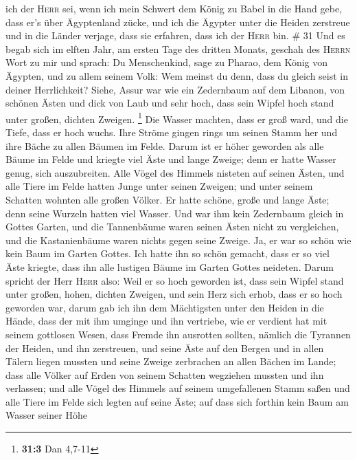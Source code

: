 ich der \textsc{Herr} sei, wenn ich mein Schwert dem König zu Babel in
die Hand gebe, dass er's über Ägyptenland zücke,  und ich
die Ägypter unter die Heiden zerstreue und in die Länder verjage, dass
sie erfahren, dass ich der \textsc{Herr} bin. \# 31  Und
es begab sich im elften Jahr, am ersten Tage des dritten Monats, geschah
des \textsc{Herrn} Wort zu mir und sprach:  Du
Menschenkind, sage zu Pharao, dem König von Ägypten, und zu allem seinem
Volk: Wem meinst du denn, dass du gleich seist in deiner Herrlichkeit?
 Siehe, Assur war wie ein Zedernbaum auf dem Libanon, von
schönen Ästen und dick von Laub und sehr hoch, dass sein Wipfel hoch
stand unter großen, dichten Zweigen. \footnote{\textbf{31:3} Dan 4,7-11}
 Die Wasser machten, dass er groß ward, und die Tiefe,
dass er hoch wuchs. Ihre Ströme gingen rings um seinen Stamm her und
ihre Bäche zu allen Bäumen im Felde.  Darum ist er höher
geworden als alle Bäume im Felde und kriegte viel Äste und lange Zweige;
denn er hatte Wasser genug, sich auszubreiten.  Alle Vögel
des Himmels nisteten auf seinen Ästen, und alle Tiere im Felde hatten
Junge unter seinen Zweigen; und unter seinem Schatten wohnten alle
großen Völker.  Er hatte schöne, große und lange Äste;
denn seine Wurzeln hatten viel Wasser.  Und war ihm kein
Zedernbaum gleich in Gottes Garten, und die Tannenbäume waren seinen
Ästen nicht zu vergleichen, und die Kastanienbäume waren nichts gegen
seine Zweige. Ja, er war so schön wie kein Baum im Garten Gottes.
 Ich hatte ihn so schön gemacht, dass er so viel Äste
kriegte, dass ihn alle lustigen Bäume im Garten Gottes neideten.
 Darum spricht der Herr \textsc{Herr} also: Weil er so
hoch geworden ist, dass sein Wipfel stand unter großen, hohen, dichten
Zweigen, und sein Herz sich erhob, dass er so hoch geworden war,
 darum gab ich ihn dem Mächtigsten unter den Heiden in
die Hände, dass der mit ihm umginge und ihn vertriebe, wie er verdient
hat mit seinem gottlosen Wesen,  dass Fremde ihn
ausrotten sollten, nämlich die Tyrannen der Heiden, und ihn zerstreuen,
und seine Äste auf den Bergen und in allen Tälern liegen mussten und
seine Zweige zerbrachen an allen Bächen im Lande; dass alle Völker auf
Erden von seinem Schatten wegziehen mussten und ihn verlassen;
 und alle Vögel des Himmels auf seinem umgefallenen Stamm
saßen und alle Tiere im Felde sich legten auf seine Äste;
 auf dass sich forthin kein Baum am Wasser seiner Höhe
